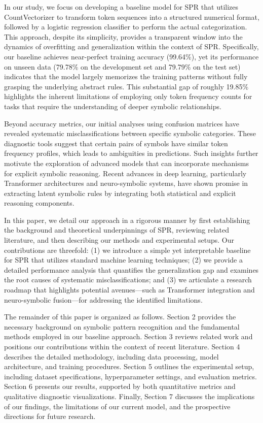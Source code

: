\documentclass{article}
\begin{document}
In our study, we focus on developing a baseline model for SPR that utilizes CountVectorizer to transform token sequences into a structured numerical format, followed by a logistic regression classifier to perform the actual categorization. This approach, despite its simplicity, provides a transparent window into the dynamics of overfitting and generalization within the context of SPR. Specifically, our baseline achieves near-perfect training accuracy (99.64\%), yet its performance on unseen data (79.78\% on the development set and 79.79\% on the test set) indicates that the model largely memorizes the training patterns without fully grasping the underlying abstract rules. This substantial gap of roughly 19.85\% highlights the inherent limitations of employing only token frequency counts for tasks that require the understanding of deeper symbolic relationships.

Beyond accuracy metrics, our initial analyses using confusion matrices have revealed systematic misclassifications between specific symbolic categories. These diagnostic tools suggest that certain pairs of symbols have similar token frequency profiles, which leads to ambiguities in predictions. Such insights further motivate the exploration of advanced models that can incorporate mechanisms for explicit symbolic reasoning. Recent advances in deep learning, particularly Transformer architectures and neuro-symbolic systems, have shown promise in extracting latent symbolic rules by integrating both statistical and explicit reasoning components.

In this paper, we detail our approach in a rigorous manner by first establishing the background and theoretical underpinnings of SPR, reviewing related literature, and then describing our methods and experimental setups. Our contributions are threefold: (1) we introduce a simple yet interpretable baseline for SPR that utilizes standard machine learning techniques; (2) we provide a detailed performance analysis that quantifies the generalization gap and examines the root causes of systematic misclassifications; and (3) we articulate a research roadmap that highlights potential avenues—such as Transformer integration and neuro-symbolic fusion—for addressing the identified limitations.

The remainder of this paper is organized as follows. Section 2 provides the necessary background on symbolic pattern recognition and the fundamental methods employed in our baseline approach. Section 3 reviews related work and positions our contributions within the context of recent literature. Section 4 describes the detailed methodology, including data processing, model architecture, and training procedures. Section 5 outlines the experimental setup, including dataset specifications, hyperparameter settings, and evaluation metrics. Section 6 presents our results, supported by both quantitative metrics and qualitative diagnostic visualizations. Finally, Section 7 discusses the implications of our findings, the limitations of our current model, and the prospective directions for future research.
\end{document}
